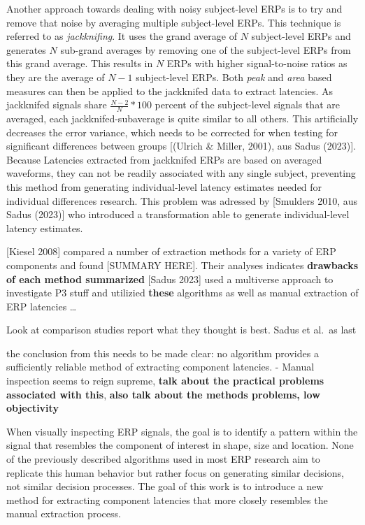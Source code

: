 \documentclass[
  man,floatsintext]{apa7}
\begin{document}
Another approach towards dealing with noisy subject-level ERPs is to try and remove that noise by averaging multiple subject-level ERPs. This technique is referred to as \emph{jackknifing}. It uses the grand average of \(N\) subject-level ERPs and generates \(N\) sub-grand averages by removing one of the subject-level ERPs from this grand average. This results in \(N\) ERPs with higher signal-to-noise ratios as they are the average of \(N-1\) subject-level ERPs. Both \emph{peak} and \emph{area} based measures can then be applied to the jackknifed data to extract latencies. As jackknifed signals share \(\frac{N-2}{N} * 100\) percent of the subject-level signals that are averaged, each jackknifed-subaverage is quite similar to all others. This artificially decreases the error variance, which needs to be corrected for when testing for significant differences between groups {[}(Ulrich \& Miller, 2001), aus Sadus (2023){]}. Because Latencies extracted from jackknifed ERPs are based on averaged waveforms, they can not be readily associated with any single subject, preventing this method from generating individual-level latency estimates needed for individual differences research. This problem was adressed by {[}Smulders 2010, aus Sadus (2023){]} who introduced a transformation able to generate individual-level latency estimates.

{[}Kiesel 2008{]} compared a number of extraction methods for a variety of ERP components and found {[}SUMMARY HERE{]}. Their analyses indicates \textbf{drawbacks of each method summarized}
{[}Sadus 2023{]} used a multiverse approach to investigate P3 stuff and utilizied \textbf{these} algorithms as well as manual extraction of ERP latencies \ldots{}

Look at comparison studies report what they thought is best. Sadus et al.~as last

the conclusion from this needs to be made clear: no algorithm provides a sufficiently reliable method of extracting component latencies. - Manual inspection seems to reign supreme, \textbf{talk about the practical problems associated with this}, \textbf{also talk about the methods problems, low objectivity}

When visually inspecting ERP signals, the goal is to identify a pattern within the signal that resembles the component of interest in shape, size and location. None of the previously described algorithms used in most ERP research aim to replicate this human behavior but rather focus on generating similar decisions, not similar decision processes. The goal of this work is to introduce a new method for extracting component latencies that more closely resembles the manual extraction process.
\end{document}
